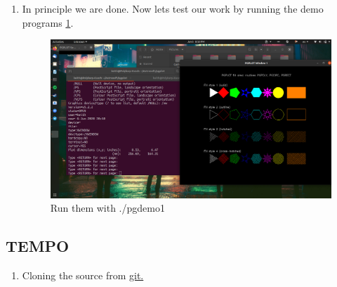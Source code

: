 \documentclass{article}
\begin{document}
\begin{enumerate}
\begin{enumerate}
    			\item In principle we are done. Now lets test our work by running the demo programs \ref{fig:sucesfful-pgplot-install}.  
    			\begin{figure}[h]
    				\includegraphics[width=\linewidth]{Images/sucesfful-pgplot-install.png}
    				\caption{Run them with ./pgdemo1}
    				\label{fig:sucesfful-pgplot-install}  			
    			\end{figure}    	
    		\end{enumerate}   		
    	\end{enumerate}
    	
    	\subsection{TEMPO}
    	\begin{enumerate}
    		\item Cloning the source from \href{git://git.code.sf.net/p/tempo/tempo}{git.} 
    	\end{enumerate}

    	
\end{document}
